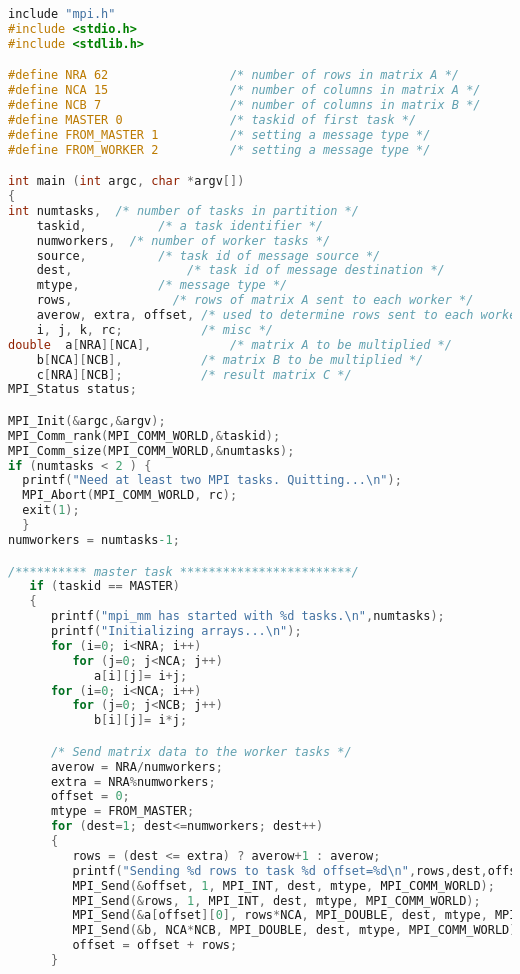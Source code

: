 \begin{lstlisting}[language=C, caption={An example of Matrix multiplication using MPI. \citep{Barney:16-mpi}}, label={lst:mpi_example}]
include "mpi.h"
#include <stdio.h>
#include <stdlib.h>

#define NRA 62                 /* number of rows in matrix A */
#define NCA 15                 /* number of columns in matrix A */
#define NCB 7                  /* number of columns in matrix B */
#define MASTER 0               /* taskid of first task */
#define FROM_MASTER 1          /* setting a message type */
#define FROM_WORKER 2          /* setting a message type */

int main (int argc, char *argv[])
{
int	numtasks,  /* number of tasks in partition */
	taskid,			 /* a task identifier */
	numworkers,	 /* number of worker tasks */
	source,			 /* task id of message source */
	dest,				 /* task id of message destination */
	mtype,			 /* message type */
	rows,			   /* rows of matrix A sent to each worker */
	averow, extra, offset, /* used to determine rows sent to each worker */
	i, j, k, rc;           /* misc */
double	a[NRA][NCA],           /* matrix A to be multiplied */
	b[NCA][NCB],           /* matrix B to be multiplied */
	c[NRA][NCB];           /* result matrix C */
MPI_Status status;

MPI_Init(&argc,&argv);
MPI_Comm_rank(MPI_COMM_WORLD,&taskid);
MPI_Comm_size(MPI_COMM_WORLD,&numtasks);
if (numtasks < 2 ) {
  printf("Need at least two MPI tasks. Quitting...\n");
  MPI_Abort(MPI_COMM_WORLD, rc);
  exit(1);
  }
numworkers = numtasks-1;

/********** master task ************************/
   if (taskid == MASTER)
   {
      printf("mpi_mm has started with %d tasks.\n",numtasks);
      printf("Initializing arrays...\n");
      for (i=0; i<NRA; i++)
         for (j=0; j<NCA; j++)
            a[i][j]= i+j;
      for (i=0; i<NCA; i++)
         for (j=0; j<NCB; j++)
            b[i][j]= i*j;

      /* Send matrix data to the worker tasks */
      averow = NRA/numworkers;
      extra = NRA%numworkers;
      offset = 0;
      mtype = FROM_MASTER;
      for (dest=1; dest<=numworkers; dest++)
      {
         rows = (dest <= extra) ? averow+1 : averow;   	
         printf("Sending %d rows to task %d offset=%d\n",rows,dest,offset);
         MPI_Send(&offset, 1, MPI_INT, dest, mtype, MPI_COMM_WORLD);
         MPI_Send(&rows, 1, MPI_INT, dest, mtype, MPI_COMM_WORLD);
         MPI_Send(&a[offset][0], rows*NCA, MPI_DOUBLE, dest, mtype, MPI_COMM_WORLD);
         MPI_Send(&b, NCA*NCB, MPI_DOUBLE, dest, mtype, MPI_COMM_WORLD);
         offset = offset + rows;
      }


\end{lstlisting}
